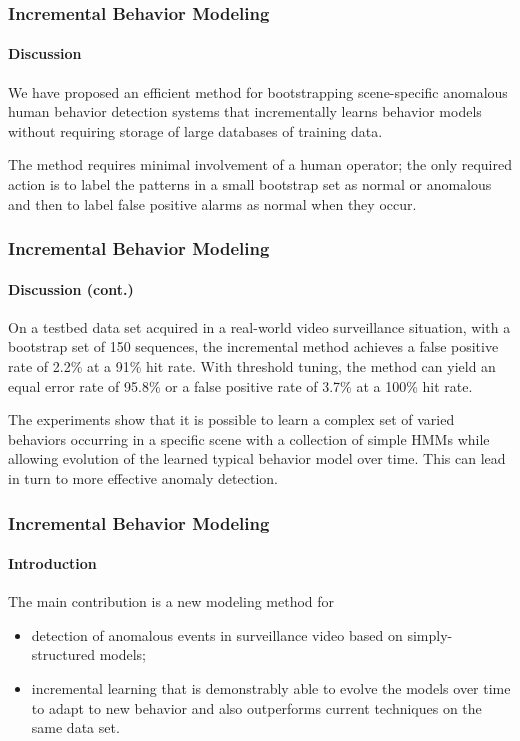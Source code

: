 
\begin{frame}
    \frametitle{Incremental Behavior Modeling}
    \framesubtitle{Discussion}

    We have proposed an efficient method for bootstrapping 
    scene-specific anomalous human behavior detection systems that 
    incrementally learns behavior models \alert{without} requiring storage
    of large databases of training data. 
    
    \bigskip
    
    The method requires minimal involvement of a human operator; the only 
    required action is to label the 
    patterns in a small bootstrap set as normal or anomalous and
    then to label false positive alarms as normal when they occur.

\end{frame}


\begin{frame}
    \frametitle{Incremental Behavior Modeling}
    \framesubtitle{Discussion (cont.)}

    On a testbed data set acquired in a real-world video surveillance 
    situation, with a bootstrap set of 
    150 sequences, the incremental method achieves a false positive rate of 
    2.2\% at a 91\% hit rate. With
    threshold tuning, the method can yield an equal error rate of 95.8\% 
    or a false positive rate of 3.7\% at a 100\% hit rate. 
    
    \bigskip
    
    The experiments show that it is possible to learn a complex 
    set of varied behaviors occurring in a specific scene with a collection 
    of simple HMMs while allowing evolution of the
    learned typical behavior model over time. This can lead in turn to more 
    effective anomaly detection.

\end{frame}


\else

\begin{frame}
    \frametitle{Incremental Behavior Modeling}
    \framesubtitle{Introduction}

    The main contribution is a new modeling method for 
    \begin{itemize}
        \item detection of anomalous events in 
            surveillance video based on simply-structured models; 
        \item incremental learning that is demonstrably able to evolve 
            the models over time to adapt to new behavior and also
            outperforms current techniques on the same data set.
    \end{itemize}

\end{frame}

